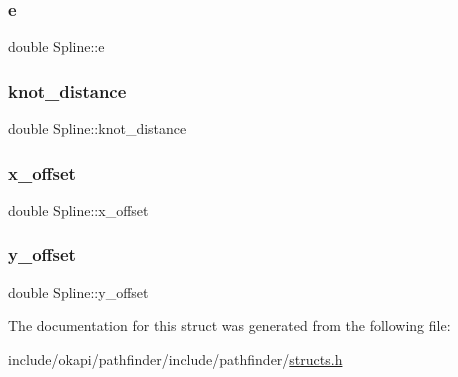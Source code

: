 \subsubsection{\texorpdfstring{e}{e}}
{\footnotesize\ttfamily double Spline\+::e}

\mbox{\label{structSpline_a3b05595ec975c153ab36c3d064cc8266}} 
\subsubsection{\texorpdfstring{knot\_distance}{knot\_distance}}
{\footnotesize\ttfamily double Spline\+::knot\+\_\+distance}

\mbox{\label{structSpline_a8ba4a94300befec100072f52b3d94212}} 
\subsubsection{\texorpdfstring{x\_offset}{x\_offset}}
{\footnotesize\ttfamily double Spline\+::x\+\_\+offset}

\mbox{\label{structSpline_a100540b91150c4fc64983c3ac9107beb}} 
\subsubsection{\texorpdfstring{y\_offset}{y\_offset}}
{\footnotesize\ttfamily double Spline\+::y\+\_\+offset}



The documentation for this struct was generated from the following file\+:\begin{DoxyCompactItemize}
\item 
include/okapi/pathfinder/include/pathfinder/\mbox{\hyperlink{structs_8h}{structs.\+h}}\end{DoxyCompactItemize}
